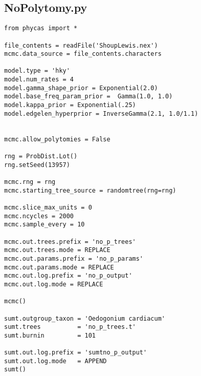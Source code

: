 \documentclass{article}
\begin{document}
\newpage
\subsection{NoPolytomy.py}\label{NoPolytomy}
\begin{verbatim}
from phycas import *

file_contents = readFile('ShoupLewis.nex')
mcmc.data_source = file_contents.characters

model.type = 'hky'   
model.num_rates = 4       
model.gamma_shape_prior = Exponential(2.0)
model.base_freq_param_prior =  Gamma(1.0, 1.0)
model.kappa_prior = Exponential(.25)
model.edgelen_hyperprior = InverseGamma(2.1, 1.0/1.1)


mcmc.allow_polytomies = False

rng = ProbDist.Lot()
rng.setSeed(13957)

mcmc.rng = rng
mcmc.starting_tree_source = randomtree(rng=rng)

mcmc.slice_max_units = 0
mcmc.ncycles = 2000
mcmc.sample_every = 10

mcmc.out.trees.prefix = 'no_p_trees'
mcmc.out.trees.mode = REPLACE
mcmc.out.params.prefix = 'no_p_params'
mcmc.out.params.mode = REPLACE
mcmc.out.log.prefix = 'no_p_output'
mcmc.out.log.mode = REPLACE

mcmc()

sumt.outgroup_taxon = 'Oedogonium cardiacum'
sumt.trees          = 'no_p_trees.t'
sumt.burnin         = 101

sumt.out.log.prefix = 'sumtno_p_output'
sumt.out.log.mode   = APPEND
sumt()
\end{verbatim}

\newpage

\end{document}
